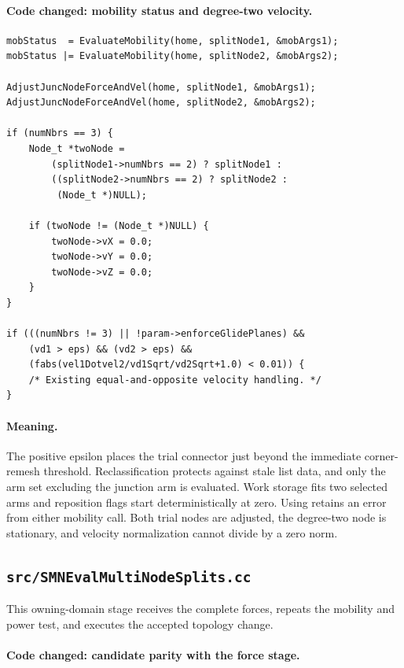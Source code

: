 \documentclass[11pt]{article}
\newcommand{\code}[1]{\texttt{\detokenize{#1}}}
\begin{document}
\paragraph{Code changed: mobility status and degree-two velocity.}

\begin{lstlisting}[style=cpp]
mobStatus  = EvaluateMobility(home, splitNode1, &mobArgs1);
mobStatus |= EvaluateMobility(home, splitNode2, &mobArgs2);

AdjustJuncNodeForceAndVel(home, splitNode1, &mobArgs1);
AdjustJuncNodeForceAndVel(home, splitNode2, &mobArgs2);

if (numNbrs == 3) {
    Node_t *twoNode =
        (splitNode1->numNbrs == 2) ? splitNode1 :
        ((splitNode2->numNbrs == 2) ? splitNode2 :
         (Node_t *)NULL);

    if (twoNode != (Node_t *)NULL) {
        twoNode->vX = 0.0;
        twoNode->vY = 0.0;
        twoNode->vZ = 0.0;
    }
}

if (((numNbrs != 3) || !param->enforceGlidePlanes) &&
    (vd1 > eps) && (vd2 > eps) &&
    (fabs(vel1Dotvel2/vd1Sqrt/vd2Sqrt+1.0) < 0.01)) {
    /* Existing equal-and-opposite velocity handling. */
}
\end{lstlisting}

\paragraph{Meaning.}
The positive epsilon places the trial connector just beyond the immediate
corner-remesh threshold.  Reclassification protects against stale list data,
and only the arm set excluding the junction arm is evaluated.  Work storage
fits two selected arms and reposition flags start deterministically at zero.
Using \code{|=} retains an error from either mobility call.  Both trial nodes
are adjusted, the degree-two node is stationary, and velocity normalization
cannot divide by a zero norm.

\subsection{\texttt{src/SMNEvalMultiNodeSplits.cc}}

This owning-domain stage receives the complete forces, repeats the mobility
and power test, and executes the accepted topology change.

\paragraph{Code changed: candidate parity with the force stage.}
\end{document}
